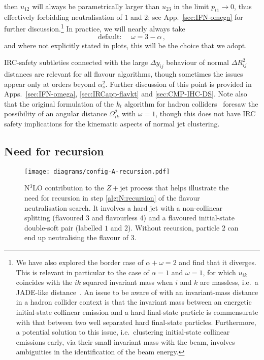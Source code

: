 \documentclass[nofootinbib,twocolumn,preprintnumbers,superscriptaddress,aps]{revtex4-2}
\newcommand{\as}{\alpha_s}
\begin{document}
then $u_{12}$ will always be parametrically larger than $u_{23}$ in
the limit $p_{t1} \to 0$, thus effectively forbidding neutralisation
of $1$ and $2$; see App.~\ref{sec:IFN-omega} for further discussion.\footnote{We have also explored the border case of
  $\alpha + \omega = 2$ and find that it diverges.
  This is relevant in particular to the case of $\alpha=1$ and $\omega=1$,
  for which $u_{ik}$ coincides with the $ik$ squared invariant mass
  when $i$ and $k$ are massless, i.e.\ a JADE-like
  distance~\cite{JADE:1986kta,JADE:1988xlj}.
  An issue to be aware of with an invariant-mass distance in a
  hadron collider context is that the invariant mass between an energetic
  initial-state collinear emission and a hard final-state particle is
  commensurate with that between two well separated hard final-state
  particles.
  Furthermore, a potential solution to this issue, i.e.\ clustering
  initial-state collinear emissions early, via their small invariant
  mass with the beam, involves ambiguities in the identification of
  the beam energy.
}
%
In practice, we will nearly always take
\begin{equation}
  \label{eq:default-omega}
  \text{default: }\quad\omega = 3 - \alpha\,,
\end{equation}
and where not explicitly stated in plots, this will be the choice that
we adopt.


IRC-safety subtleties connected with the large $\Delta y_{ij}$
behaviour of normal $\Delta R_{ij}^2$ distances are relevant for all
flavour algorithms, though sometimes the issues appear only at orders
beyond $\as^2$.
%
Further discussion of this point is provided in
Apps.~\ref{sec:IFN-omega}, \ref{sec:IRCapp-flavkt}
and \ref{sec:CMP-IHC-DS}.
%
Note also that the original formulation of the $k_t$ algorithm for
hadron colliders~\cite{Catani:1993hr} foresaw the possibility of an
angular distance $\Omega_{ik}^2$ with $\omega=1$, though this does not
have IRC safety implications for the kinematic aspects of normal jet
clustering.
%

\subsection{Need for recursion}
\label{sec:need-recursion}

\begin{figure}
  \centering
  \texttt{[image: diagrams/config-A-recursion.pdf]}
  \caption{
    N$^3$LO contribution to the $Z+\text{jet}$ process that helps illustrate the need for
    recursion in step \ref{alg:N:recursion} of the flavour neutralisation search. 
    It involves a hard jet with a non-collinear splitting (flavoured
    $3$ and flavourless $4$) and a flavoured initial-state double-soft
    pair (labelled $1$ and $2$).
    Without recursion, particle $2$ can end up neutralising the flavour
    of $3$.
  }
  \label{fig:need-for-recursion}
\end{figure}
\end{document}
